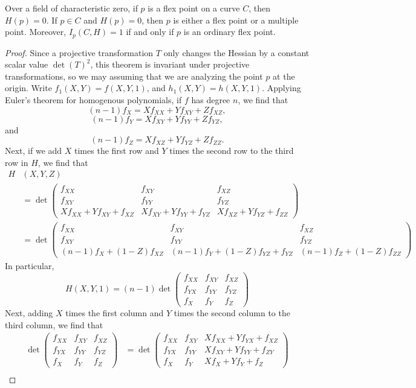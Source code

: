 \begin{theorem}
    Over a field of characteristic zero, if $p$ is a flex point on a curve $C$, then $H(p) = 0$. If $p \in C$ and $H(p) = 0$, then $p$ is either a flex point or a multiple point. Moreover, $I_p(C,H) = 1$ if and only if $p$ is an ordinary flex point.
\end{theorem}
\begin{proof}
    Since a projective transformation $T$ only changes the Hessian by a constant scalar value $\det(T)^2$, this theorem is invariant under projective transformations, so we may assuming that we are analyzing the point $p$ at the origin. Write $f_1(X,Y) = f(X,Y,1)$, and $h_1(X,Y) = h(X,Y,1)$. Applying Euler's theorem for homogenous polynomials, if $f$ has degree $n$, we find that
    \[ (n-1) f_X = X f_{XX} + Y f_{XY} + Z f_{XZ}, \]
    \[ (n-1) f_Y = X f_{XY} + Y f_{YY} + Z f_{YZ}, \]
    and
    \[ (n-1) f_Z = X f_{XZ} + Y f_{YZ} + Z f_{ZZ}. \]
    Next, if we add $X$ times the first row and $Y$ times the second row to the third row in $H$, we find that
    \begin{align*}
        H & (X,Y,Z)\\
        &= \det \begin{pmatrix} f_{XX} & f_{XY} & f_{XZ} \\ f_{XY} & f_{YY} & f_{YZ} \\ Xf_{XX} + Yf_{XY} + f_{XZ} & Xf_{XY} + Yf_{YY} + f_{YZ} & Xf_{XZ} + Yf_{YZ} + f_{ZZ} \end{pmatrix}\\
        &= \det \begin{pmatrix} f_{XX} & f_{XY} & f_{XZ} \\ f_{XY} & f_{YY} & f_{YZ} \\ (n-1) f_X + (1 - Z)f_{XZ} & (n-1) f_Y + (1-Z) f_{YZ} + f_{YZ} & (n-1) f_Z + (1-Z)f_{ZZ} \end{pmatrix}
    \end{align*}
    In particular,
    \[ H(X,Y,1) = (n-1) \det \begin{pmatrix} f_{XX} & f_{XY} & f_{XZ} \\ f_{YX} & f_{YY} & f_{YZ} \\ f_X & f_Y & f_Z \end{pmatrix} \]
    Next, adding $X$ times the first column and $Y$ times the second column to the third column, we find that
    \begin{align*}
        \det \begin{pmatrix} f_{XX} & f_{XY} & f_{XZ} \\ f_{YX} & f_{YY} & f_{YZ} \\ f_X & f_Y & f_Z \end{pmatrix} &= \det \begin{pmatrix} f_{XX} & f_{XY} & Xf_{XX} + Yf_{YX} + f_{XZ} \\ f_{YX} & f_{YY} & Xf_{XY} + Yf_{YY} + f_{ZY} \\ f_X & f_Y & Xf_X + Yf_Y + f_Z \end{pmatrix}\\

\end{align*}
\end{proof}
